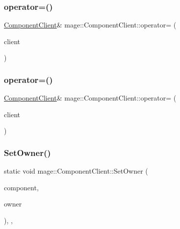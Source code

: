 \subsubsection{\texorpdfstring{operator=()}{operator=()}\hspace{0.1cm}{\footnotesize\ttfamily [1/2]}}
{\footnotesize\ttfamily \hyperlink{classmage_1_1_component_client}{Component\+Client}\& mage\+::\+Component\+Client\+::operator= (\begin{DoxyParamCaption}\item[{const \hyperlink{classmage_1_1_component_client}{Component\+Client} \&}]{client }\end{DoxyParamCaption})\hspace{0.3cm}{\ttfamily [delete]}}

\hypertarget{classmage_1_1_component_client_a6fa428db7961bc604b44710583563019}{}\label{classmage_1_1_component_client_a6fa428db7961bc604b44710583563019} 
\subsubsection{\texorpdfstring{operator=()}{operator=()}\hspace{0.1cm}{\footnotesize\ttfamily [2/2]}}
{\footnotesize\ttfamily \hyperlink{classmage_1_1_component_client}{Component\+Client}\& mage\+::\+Component\+Client\+::operator= (\begin{DoxyParamCaption}\item[{\hyperlink{classmage_1_1_component_client}{Component\+Client} \&\&}]{client }\end{DoxyParamCaption})\hspace{0.3cm}{\ttfamily [delete]}}

\hypertarget{classmage_1_1_component_client_a268413a2179e0f29ac78b0c5f26ecaca}{}\label{classmage_1_1_component_client_a268413a2179e0f29ac78b0c5f26ecaca} 
\subsubsection{\texorpdfstring{Set\+Owner()}{SetOwner()}}
{\footnotesize\ttfamily static void mage\+::\+Component\+Client\+::\+Set\+Owner (\begin{DoxyParamCaption}\item[{\hyperlink{classmage_1_1_component}{Component} \&}]{component,  }\item[{\hyperlink{classmage_1_1_proxy_ptr}{Proxy\+Ptr}$<$ \hyperlink{classmage_1_1_node}{Node} $>$}]{owner }\end{DoxyParamCaption})\hspace{0.3cm}{\ttfamily [static]}, {\ttfamily [private]}, {\ttfamily [noexcept]}}

